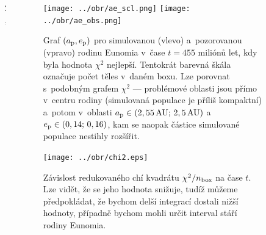 \documentclass{beamer}
\newlength{\sep}
\newlength{\vyska}
\newlength{\vyskaB}
\newlength{\vyskaC}
\newlength{\side}
\newlength{\main}
\begin{document}
\begin{frame}
\begin{columns}[t]
\begin{column}{\main}
\begin{tcolorbox}[title=Výsledky\phantom{Úy},height=\vyskaB]
\end{tcolorbox}
\vspace{\sep}
\end{column}

\begin{column}{2\sep}
\end{column}

\begin{column}{\side}
\begin{tcolorbox}[title=Závěry\phantom{Úy},height=0.4\vyskaC]
		\begin{figure}
		\centering
		\texttt{[image: ../obr/ae\_scl.png]}
		\texttt{[image: ../obr/ae\_obs.png]}
		\caption{Graf $(a_{\rm p}, e_{\rm p})$ pro simulovanou (vlevo) a~pozorovanou (vpravo) rodinu Eunomia v~čase $t=455$ miliónů let, kdy byla hodnota $\chi^2$ nejlepší. Tentokrát barevná škála označuje počet těles v~daném boxu. Lze porovnat s~podobným grafem $\chi^2$ --- problémové oblasti jsou přímo v~centru rodiny (simulovaná populace je příliš kompaktní) a~potom v~oblasti $a_{\rm p}\in(2,55\,{\rm AU};\,2,5\,{\rm AU})$ a~$e_{\rm p}\in(0,14;\,0,16)$, kam se naopak částice simulované populace nestihly rozšířit.} \label{fig:ae_obs_scl}
	\end{figure}

\end{tcolorbox}
\vspace{\sep}
\begin{tcolorbox}[title=Budoucí práce\phantom{Úy},height=0.3\vyskaC]
	\begin{figure}
		\centering
		\texttt{[image: ../obr/chi2.eps]}
		\caption{Závislost redukovaného chí kvadrátu $\chi^2/n_{\rm box}$ na čase $t$. Lze vidět, že se jeho hodnota snižuje, tudíž můžeme předpokládat, že bychom delší integrací dostali nižší hodnoty, případně bychom mohli určit interval stáří rodiny Eunomia.} \label{fig:chi2}
	\end{figure}
\end{tcolorbox}
\vspace{\sep}
\begin{tcolorbox}[title=Reference\phantom{Úy},height=0.3\vyskaC]
		\printbibliography
\end{tcolorbox}
\end{column}

\begin{column}{\sep}
\end{column}

\end{columns}
\end{frame}
\end{document}
